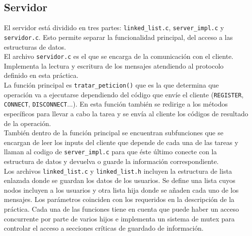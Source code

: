 \subsection{Servidor}

El servidor está dividido en tres partes: \texttt{linked\_list.c}, \texttt{server\_impl.c} y \texttt{servidor.c}.
Esto permite separar la funcionalidad principal, del acceso a las estructuras de datos.\\

El archivo \texttt{servidor.c} es el que se encarga de la comunicación con el cliente. Implementa la lectura y escritura de los mensajes atendiendo al protocolo definido en esta práctica.\\

La función principal es \texttt{tratar\_peticion()} que es la que determina que operación va a ejecutarse dependiendo del código que envíe el cliente (\texttt{REGISTER}, \texttt{CONNECT}, \texttt{DISCONNECT}...). En esta función también se redirige a los métodos específicos para llevar a cabo la tarea y se envía al cliente los códigos de resultado de la operación.\\

También dentro de la función principal se encuentran subfunciones que se encargan de leer los inputs del cliente que depende de cada una de las tareas y llaman al codigo de \texttt{server\_impl.c} para que éste último conecte con la estructura de datos y devuelva o guarde la información correspondiente.\\

Los archivos \texttt{linked\_list.c} y \texttt{linked\_list.h} incluyen la estructura de lista enlazada donde se guardan los datos de los usuarios. Se define una lista cuyos nodos incluyen a los usuarios y otra lista hija donde se añaden cada uno de los mensajes. Los parámetros coinciden con los requeridos en la descripción de la práctica. Cada una de las funciones tiene en cuenta que puede haber un acceso concurrente por parte de varios hijos e implementa un sistema de mutex para controlar el acceso a secciones críticas de guardado de información.
